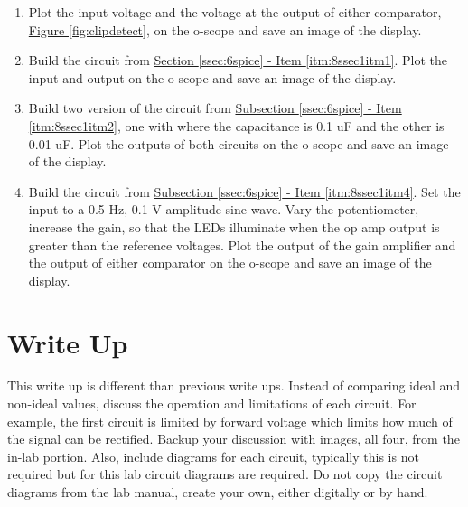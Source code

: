 \begin{enumerate}
\item Plot the input voltage and the voltage at the output of either comparator, \hyperref[fig:clipdetect]{Figure \ref*{fig:clipdetect}}, on the o-scope and save an image of the display. 
	\item Build the circuit from \hyperref[itm:8ssec1itm1]{Section \ref*{ssec:6spice} - Item \ref*{itm:8ssec1itm1}}. Plot the input and output on the o-scope and save an image of the display.
	\item Build two version of the circuit from \hyperref[itm:8ssec1itm2]{Subsection \ref*{ssec:6spice} - Item \ref*{itm:8ssec1itm2}}, one with where the capacitance is 0.1 uF and the other is 0.01 uF. Plot the outputs of both circuits on the o-scope and save an image of the display. 
	\item Build the circuit from \hyperref[itm:8ssec1itm3]{Subsection \ref*{ssec:6spice} - Item \ref*{itm:8ssec1itm4}}. Set the input to a 0.5 Hz, 0.1 V amplitude sine wave. Vary the potentiometer, increase the gain, so that the LEDs illuminate when the op amp output is greater than the reference voltages. Plot the output of the gain amplifier and the output of either comparator on the o-scope and save an image of the display.
\end{enumerate}


\section{Write Up}

This write up is different than previous write ups. Instead of comparing ideal and non-ideal values, discuss the operation and limitations of each circuit. For example, the first circuit is limited by forward voltage which limits how much of the signal can be rectified. Backup your discussion with images, all four, from the in-lab portion. Also, include diagrams for each circuit, typically this is not required but for this lab circuit diagrams are required. Do not copy the circuit diagrams from the lab manual, create your own, either digitally or by hand. 




